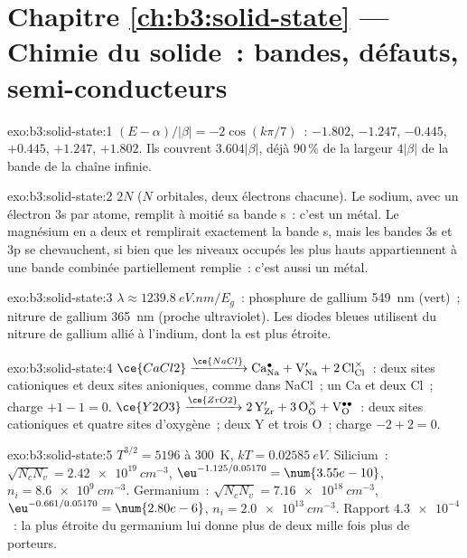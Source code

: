 \section*{Chapitre \ref{ch:b3:solid-state} --- Chimie du solide~: bandes, défauts, semi-conducteurs}

\begin{solution}{exo:b3:solid-state:1}
$(E - \alpha)/|\beta| = -2\cos(k\pi/7)$~: $-1.802$, $-1.247$, $-0.445$, $+0.445$, $+1.247$, $+1.802$. Ils couvrent
$3.604|\beta|$, déjà 90\,\% de la largeur $4|\beta|$ de la bande de la chaîne infinie.
\end{solution}

\begin{solution}{exo:b3:solid-state:2}
$2N$ ($N$ orbitales, deux électrons chacune). Le sodium, avec un électron 3s par atome, remplit à moitié
sa bande s~: c'est un métal. Le magnésium en a deux et remplirait
exactement la bande s, mais les bandes 3s et 3p se chevauchent, si bien que
les niveaux occupés les plus hauts appartiennent à une bande combinée
partiellement remplie~: c'est aussi un métal.
\end{solution}

\begin{solution}{exo:b3:solid-state:3}
$\lambda \approx \qty{1239.8}{eV.nm}/E_g$~: phosphure de gallium \qty{549}{nm} (vert)~; nitrure de gallium \qty{365}{nm}
(proche ultraviolet). Les diodes bleues utilisent du nitrure de gallium
allié à l'indium, dont la  est plus étroite.
\end{solution}

\begin{solution}{exo:b3:solid-state:4}
$\ce{CaCl2} \xrightarrow{\ce{NaCl}} \mathrm{Ca_{Na}^{\bullet} + V_{Na}' + 2\,Cl_{Cl}^{\times}}$~: deux sites cationiques et deux sites anioniques, comme dans NaCl~; un Ca et
deux Cl~; charge $+1 - 1 = 0$. $\ce{Y2O3} \xrightarrow{\ce{ZrO2}} \mathrm{2\,Y_{Zr}' + 3\,O_O^{\times} + V_O^{\bullet\bullet}}$~: deux sites cationiques et quatre sites d'oxygène~; deux Y
et trois O~; charge $-2 + 2 = 0$.
\end{solution}

\begin{solution}{exo:b3:solid-state:5}
$T^{3/2} = 5196$ à \qty{300}{K}, $kT = \qty{0.02585}{eV}$. Silicium~: $\sqrt{N_cN_v} = \qty{2.42e19}{cm^{-3}}$, $\eu^{-1.125/0.05170} = \num{3.55e-10}$,
$n_i = \qty{8.6e9}{cm^{-3}}$. Germanium~: $\sqrt{N_cN_v} = \qty{7.16e18}{cm^{-3}}$, $\eu^{-0.661/0.05170} = \num{2.80e-6}$, $n_i = \qty{2.0e13}{cm^{-3}}$. Rapport
$\num{4.3e-4}$~: la  plus étroite du germanium lui donne plus
de deux mille fois plus de porteurs.
\end{solution}

